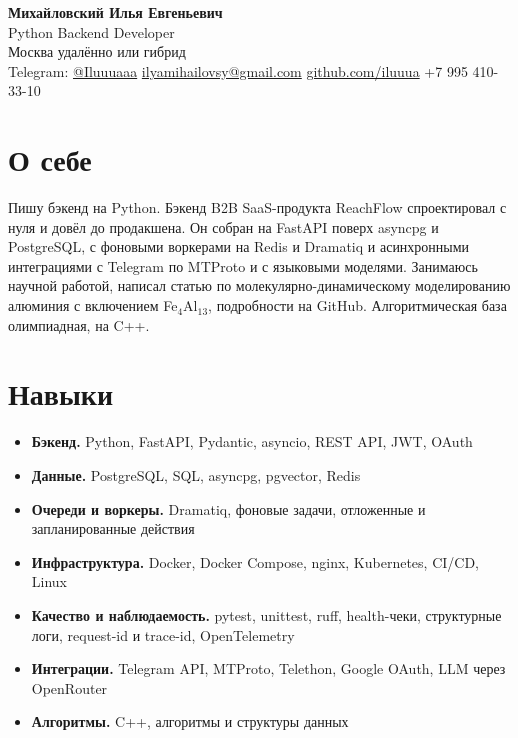 \documentclass[10pt,a4paper]{article}
\begin{document}
\begin{center}
  {\LARGE\bfseries Михайловский Илья Евгеньевич}\\[2pt]
  {\large Python Backend Developer}\\[3pt]
  Москва \textperiodcentered{} удалённо или гибрид\\[2pt]
  Telegram: \href{https://t.me/Iluuuaaa}{@Iluuuaaa} \textperiodcentered{}
  \href{mailto:ilyamihailovsy@gmail.com}{ilyamihailovsy@gmail.com} \textperiodcentered{}
  \href{https://github.com/iluuua}{github.com/iluuua} \textperiodcentered{}
  +7 995 410-33-10
\end{center}

\section{О себе}
Пишу бэкенд на Python. Бэкенд B2B SaaS-продукта ReachFlow спроектировал с нуля и довёл до продакшена. Он собран
на FastAPI поверх asyncpg и PostgreSQL, с фоновыми воркерами на Redis и Dramatiq и асинхронными
интеграциями с Telegram по MTProto и с языковыми моделями. Занимаюсь научной работой, написал статью
по молекулярно-динамическому моделированию алюминия с включением Fe$_4$Al$_{13}$, подробности на GitHub.
Алгоритмическая база олимпиадная, на C++.

\section{Навыки}
\begin{itemize}
  \item \textbf{Бэкенд.} Python, FastAPI, Pydantic, asyncio, REST API, JWT, OAuth
  \item \textbf{Данные.} PostgreSQL, SQL, asyncpg, pgvector, Redis
  \item \textbf{Очереди и воркеры.} Dramatiq, фоновые задачи, отложенные и запланированные действия
  \item \textbf{Инфраструктура.} Docker, Docker Compose, nginx, Kubernetes, CI/CD, Linux
  \item \textbf{Качество и наблюдаемость.} pytest, unittest, ruff, health-чеки, структурные логи, request-id
        и trace-id, OpenTelemetry
  \item \textbf{Интеграции.} Telegram API, MTProto, Telethon, Google OAuth, LLM через OpenRouter
  \item \textbf{Алгоритмы.} C++, алгоритмы и структуры данных
\end{itemize}
\end{document}
